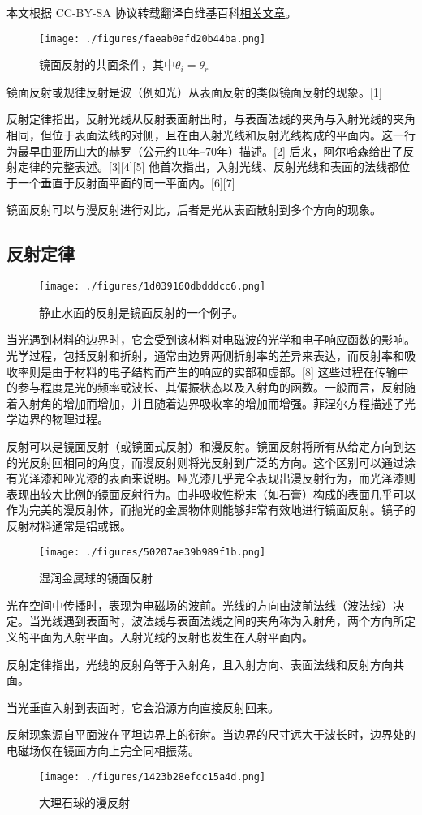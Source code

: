 
本文根据 CC-BY-SA 协议转载翻译自维基百科\href{https://en.wikipedia.org/wiki/Specular_reflection}{相关文章}。

\begin{figure}[ht]
\centering
\texttt{[image: ./figures/faeab0afd20b44ba.png]}
\caption{镜面反射的共面条件，其中\(\theta_i = \theta_r\)} \label{fig_JMFS_1}
\end{figure}
镜面反射或规律反射是波（例如光）从表面反射的类似镜面反射的现象。[1]

反射定律指出，反射光线从反射表面射出时，与表面法线的夹角与入射光线的夹角相同，但位于表面法线的对侧，且在由入射光线和反射光线构成的平面内。这一行为最早由亚历山大的赫罗（公元约10年–70年）描述。[2] 后来，阿尔哈森给出了反射定律的完整表述。[3][4][5] 他首次指出，入射光线、反射光线和表面的法线都位于一个垂直于反射面平面的同一平面内。[6][7]

镜面反射可以与漫反射进行对比，后者是光从表面散射到多个方向的现象。
\subsection{反射定律}
\begin{figure}[ht]
\centering
\texttt{[image: ./figures/1d039160dbdddcc6.png]}
\caption{静止水面的反射是镜面反射的一个例子。} \label{fig_JMFS_2}
\end{figure}
当光遇到材料的边界时，它会受到该材料对电磁波的光学和电子响应函数的影响。光学过程，包括反射和折射，通常由边界两侧折射率的差异来表达，而反射率和吸收率则是由于材料的电子结构而产生的响应的实部和虚部。[8] 这些过程在传输中的参与程度是光的频率或波长、其偏振状态以及入射角的函数。一般而言，反射随着入射角的增加而增加，并且随着边界吸收率的增加而增强。菲涅尔方程描述了光学边界的物理过程。

反射可以是镜面反射（或镜面式反射）和漫反射。镜面反射将所有从给定方向到达的光反射回相同的角度，而漫反射则将光反射到广泛的方向。这个区别可以通过涂有光泽漆和哑光漆的表面来说明。哑光漆几乎完全表现出漫反射行为，而光泽漆则表现出较大比例的镜面反射行为。由非吸收性粉末（如石膏）构成的表面几乎可以作为完美的漫反射体，而抛光的金属物体则能够非常有效地进行镜面反射。镜子的反射材料通常是铝或银。
\begin{figure}[ht]
\centering
\texttt{[image: ./figures/50207ae39b989f1b.png]}
\caption{湿润金属球的镜面反射} \label{fig_JMFS_3}
\end{figure}
光在空间中传播时，表现为电磁场的波前。光线的方向由波前法线（波法线）决定。当光线遇到表面时，波法线与表面法线之间的夹角称为入射角，两个方向所定义的平面为入射平面。入射光线的反射也发生在入射平面内。

反射定律指出，光线的反射角等于入射角，且入射方向、表面法线和反射方向共面。

当光垂直入射到表面时，它会沿源方向直接反射回来。

反射现象源自平面波在平坦边界上的衍射。当边界的尺寸远大于波长时，边界处的电磁场仅在镜面方向上完全同相振荡。
\begin{figure}[ht]
\centering
\texttt{[image: ./figures/1423b28efcc15a4d.png]}
\caption{大理石球的漫反射} \label{fig_JMFS_4}
\end{figure}